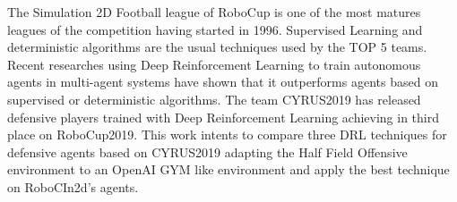 The Simulation 2D Football league of RoboCup is one of the most matures leagues of the competition having started in 1996. Supervised Learning and deterministic algorithms are the usual techniques used by the TOP 5 teams. Recent researches using Deep Reinforcement Learning to train autonomous agents in multi-agent systems have shown that it outperforms agents based on supervised or deterministic algorithms. The team CYRUS2019 has released defensive players trained with Deep Reinforcement Learning achieving in third place on RoboCup2019. This work intents to compare three DRL techniques for defensive agents based on CYRUS2019 adapting the Half Field Offensive environment to an OpenAI GYM like environment and apply the best technique on RoboCIn2d's agents.